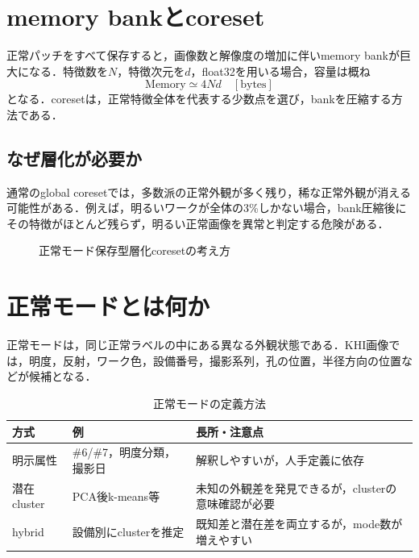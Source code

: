 \documentclass[a4paper,11pt]{ltjsarticle}
\begin{document}
\section{memory bankとcoreset}
正常パッチをすべて保存すると，画像数と解像度の増加に伴いmemory bankが巨大になる．特徴数を$N$，特徴次元を$d$，float32を用いる場合，容量は概ね
\begin{equation}
\mathrm{Memory}\simeq 4Nd\quad[\mathrm{bytes}]
\end{equation}
となる．coresetは，正常特徴全体を代表する少数点を選び，bankを圧縮する方法である．

\subsection{なぜ層化が必要か}
通常のglobal coresetでは，多数派の正常外観が多く残り，稀な正常外観が消える可能性がある．例えば，明るいワークが全体の3\%しかない場合，bank圧縮後にその特徴がほとんど残らず，明るい正常画像を異常と判定する危険がある．

\begin{figure}[H]
\centering
{}
\caption{正常モード保存型層化coresetの考え方}
\end{figure}

\section{正常モードとは何か}
正常モードは，同じ正常ラベルの中にある異なる外観状態である．KHI画像では，明度，反射，ワーク色，設備番号，撮影系列，孔の位置，半径方向の位置などが候補となる．

\begin{table}[H]
\centering
\caption{正常モードの定義方法}
\begin{tabularx}{\linewidth}{L{30mm}L{43mm}Y}
\toprule
方式 & 例 & 長所・注意点 \\
\midrule
明示属性 & \#6/\#7，明度分類，撮影日 & 解釈しやすいが，人手定義に依存 \\
潜在cluster & PCA後k-means等 & 未知の外観差を発見できるが，clusterの意味確認が必要 \\
hybrid & 設備別にclusterを推定 & 既知差と潜在差を両立するが，mode数が増えやすい \\
\bottomrule
\end{tabularx}
\end{table}
\end{document}
